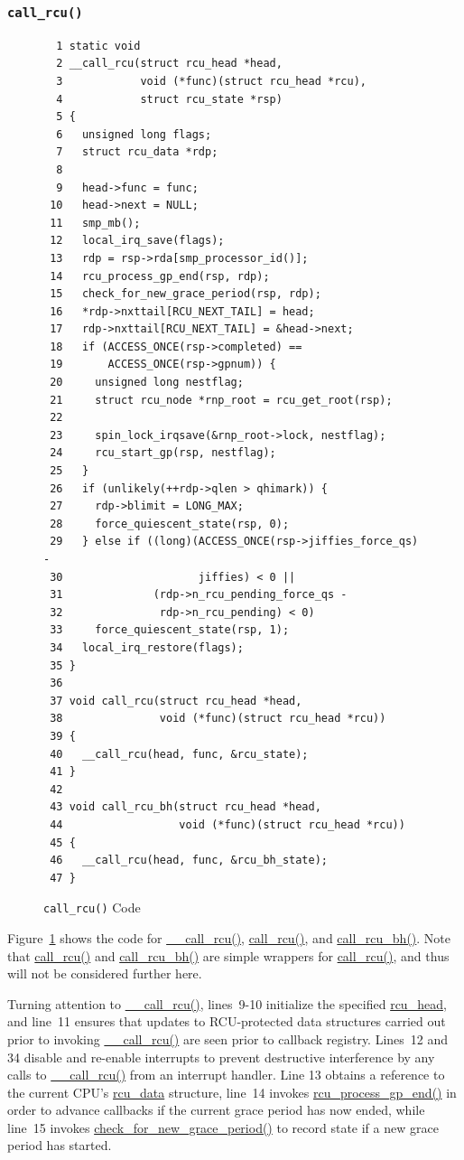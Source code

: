 \subsubsection{\tt call\_rcu()}
\label{app:rcuimpl:rcutreewt:call-rcu}

\begin{figure}[tbp]
{ \scriptsize
\begin{verbatim}
  1 static void
  2 __call_rcu(struct rcu_head *head,
  3            void (*func)(struct rcu_head *rcu),
  4            struct rcu_state *rsp)
  5 {
  6   unsigned long flags;
  7   struct rcu_data *rdp;
  8 
  9   head->func = func;
 10   head->next = NULL;
 11   smp_mb();
 12   local_irq_save(flags);
 13   rdp = rsp->rda[smp_processor_id()];
 14   rcu_process_gp_end(rsp, rdp);
 15   check_for_new_grace_period(rsp, rdp);
 16   *rdp->nxttail[RCU_NEXT_TAIL] = head;
 17   rdp->nxttail[RCU_NEXT_TAIL] = &head->next;
 18   if (ACCESS_ONCE(rsp->completed) ==
 19       ACCESS_ONCE(rsp->gpnum)) {
 20     unsigned long nestflag;
 21     struct rcu_node *rnp_root = rcu_get_root(rsp);
 22 
 23     spin_lock_irqsave(&rnp_root->lock, nestflag);
 24     rcu_start_gp(rsp, nestflag);
 25   }
 26   if (unlikely(++rdp->qlen > qhimark)) {
 27     rdp->blimit = LONG_MAX;
 28     force_quiescent_state(rsp, 0);
 29   } else if ((long)(ACCESS_ONCE(rsp->jiffies_force_qs) -
 30                     jiffies) < 0 ||
 31              (rdp->n_rcu_pending_force_qs -
 32               rdp->n_rcu_pending) < 0)
 33     force_quiescent_state(rsp, 1);
 34   local_irq_restore(flags);
 35 }
 36 
 37 void call_rcu(struct rcu_head *head,
 38               void (*func)(struct rcu_head *rcu))
 39 {
 40   __call_rcu(head, func, &rcu_state);
 41 }
 42 
 43 void call_rcu_bh(struct rcu_head *head,
 44                  void (*func)(struct rcu_head *rcu))
 45 {
 46   __call_rcu(head, func, &rcu_bh_state);
 47 }
\end{verbatim}
}
\caption{{\tt call\_rcu()} Code}
\label{fig:app:rcuimpl:rcutreewt:Code for rcutree call-rcu}
\end{figure}

Figure~\ref{fig:app:rcuimpl:rcutreewt:Code for rcutree call-rcu}
shows the code for \url{__call_rcu()}, \url{call_rcu()}, and
\url{call_rcu_bh()}.
Note that \url{call_rcu()} and \url{call_rcu_bh()} are simple wrappers
for \url{call_rcu()}, and thus will not be considered further here.

Turning attention to \url{__call_rcu()}, lines~9-10 initialize the
specified \url{rcu_head}, and line~11 ensures that updates to
RCU-protected data structures carried out prior to invoking
\url{__call_rcu()} are seen prior to callback registry.
Lines~12 and 34 disable and re-enable interrupts to prevent destructive
interference by any calls to \url{__call_rcu()} from an interrupt
handler.
Line 13 obtains a reference to the current CPU's \url{rcu_data}
structure, line~14 invokes \url{rcu_process_gp_end()} in order
to advance callbacks if the current grace period has now ended,
while line~15 invokes \url{check_for_new_grace_period()} to
record state if a new grace period has started.

